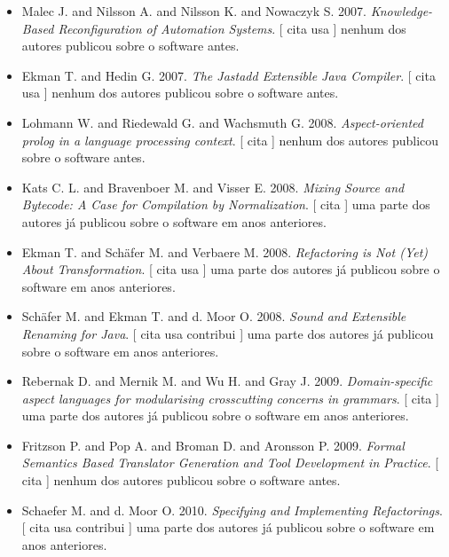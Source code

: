 \begin{itemize}
      [
          cita
          usa
          contribui
          cria
      ]
nenhum dos autores publicou sobre o software antes.
\item Malec J. and Nilsson A. and Nilsson K. and Nowaczyk S.
      2007.
        \textit{ Knowledge-Based Reconfiguration of Automation Systems}.
      [
          cita
          usa
      ]
nenhum dos autores publicou sobre o software antes.
\item Ekman T. and Hedin G.
      2007.
        \textit{ The Jastadd Extensible Java Compiler}.
      [
          cita
          usa
      ]
nenhum dos autores publicou sobre o software antes.
\item Lohmann W. and Riedewald G. and Wachsmuth G.
      2008.
        \textit{ Aspect-oriented prolog in a language processing context}.
      [
          cita
      ]
nenhum dos autores publicou sobre o software antes.
\item Kats C. L. and Bravenboer M. and Visser E.
      2008.
        \textit{ Mixing Source and Bytecode: A Case for Compilation by Normalization}.
      [
          cita
      ]
uma parte dos autores já publicou sobre o software em anos anteriores.
\item Ekman T. and Sch\"{a}fer M. and Verbaere M.
      2008.
        \textit{ Refactoring is Not (Yet) About Transformation}.
      [
          cita
          usa
      ]
uma parte dos autores já publicou sobre o software em anos anteriores.
\item Sch\"{a}fer M. and Ekman T. and d. Moor O.
      2008.
        \textit{ Sound and Extensible Renaming for Java}.
      [
          cita
          usa
          contribui
      ]
uma parte dos autores já publicou sobre o software em anos anteriores.
\item Rebernak D. and Mernik M. and Wu H. and Gray J.
      2009.
        \textit{ Domain-specific aspect languages for modularising crosscutting concerns in grammars}.
      [
          cita
      ]
uma parte dos autores já publicou sobre o software em anos anteriores.
\item Fritzson P. and Pop A. and Broman D. and Aronsson P.
      2009.
        \textit{ Formal Semantics Based Translator Generation and Tool Development in Practice}.
      [
          cita
      ]
nenhum dos autores publicou sobre o software antes.
\item Schaefer M. and d. Moor O.
      2010.
        \textit{ Specifying and Implementing Refactorings}.
      [
          cita
          usa
          contribui
      ]
uma parte dos autores já publicou sobre o software em anos anteriores.

\end{itemize}
